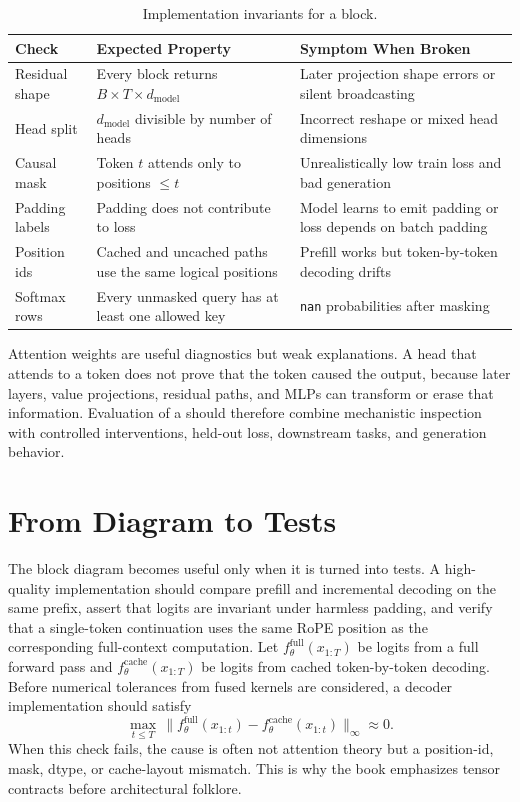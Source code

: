 \begin{table}[t]
\caption{Implementation invariants for a \transformer block.}
\label{tab:transformer-debugging-invariants}
\small
\begin{tabular}{@{}p{3.0cm}p{4.5cm}p{4.4cm}@{}}
\toprule
Check & Expected Property & Symptom When Broken \\
\midrule
Residual shape & Every block returns $B \times T \times d_{\mathrm{model}}$ & Later projection shape errors or silent broadcasting \\
Head split & $d_{\mathrm{model}}$ divisible by number of heads & Incorrect reshape or mixed head dimensions \\
Causal mask & Token $t$ attends only to positions $\leq t$ & Unrealistically low train loss and bad generation \\
Padding labels & Padding does not contribute to loss & Model learns to emit padding or loss depends on batch padding \\
Position ids & Cached and uncached paths use the same logical positions & Prefill works but token-by-token decoding drifts \\
Softmax rows & Every unmasked query has at least one allowed key & \texttt{nan} probabilities after masking \\
\bottomrule
\end{tabular}
\end{table}

Attention weights are useful diagnostics but weak explanations. A head that attends to a token does not prove that the token caused the output, because later layers, value projections, residual paths, and MLPs can transform or erase that information. Evaluation of a \transformer should therefore combine mechanistic inspection with controlled interventions, held-out loss, downstream tasks, and generation behavior.

\section{From Diagram to Tests}
\label{sec:transformer-diagram-to-tests}

The block diagram becomes useful only when it is turned into tests. A high-quality implementation should compare prefill and incremental decoding on the same prefix, assert that logits are invariant under harmless padding, and verify that a single-token continuation uses the same RoPE position as the corresponding full-context computation. Let $f_{\theta}^{\mathrm{full}}(x_{1:T})$ be logits from a full forward pass and $f_{\theta}^{\mathrm{cache}}(x_{1:T})$ be logits from cached token-by-token decoding. Before numerical tolerances from fused kernels are considered, a decoder implementation should satisfy
\begin{equation}
  \max_{t\leq T}\,
  \lVert f_{\theta}^{\mathrm{full}}(x_{1:t}) -
  f_{\theta}^{\mathrm{cache}}(x_{1:t}) \rVert_{\infty}
  \approx 0.
\end{equation}
When this check fails, the cause is often not attention theory but a position-id, mask, dtype, or cache-layout mismatch. This is why the book emphasizes tensor contracts before architectural folklore.

